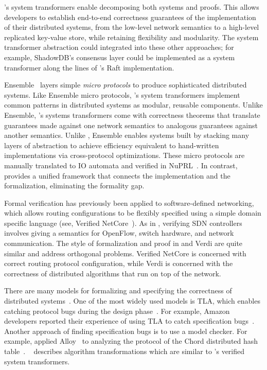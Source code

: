 \Verdi's system transformers enable decomposing both systems and proofs.
This allows developers to establish end-to-end correctness guarantees of
the implementation of their distributed systems, from the low-level network
semantics to a high-level replicated key-value store, while retaining
flexibility and modularity. The system transformer abstraction could
integrated into these other approaches; for example, ShadowDB's consensus
layer could be implemented as a system transformer along the lines of
\Verdi's Raft implementation.

Ensemble~\cite{hayden:ensemble} layers simple \textit{micro protocols}
to produce sophisticated distributed systems. Like Ensemble micro
protocols, \Verdi's system transformers implement common patterns in
distributed systems as modular, reusable components.  Unlike Ensemble,
\Verdi's systems transformers come with correctness theorems that
translate guarantees made against one network semantics to analogous
guarantees against another semantics.  Unlike \Verdi, Ensemble enables
systems built by stacking many layers of abstraction to achieve
efficiency equivalent to hand-written implementations via
cross-protocol optimizations. These micro protocols are manually
translated to IO automata and verified in
NuPRL~\cite{liu:ensemble-nuprl,ensemble-verification}. In contrast,
\Verdi provides a unified framework that connects the implementation
and the formalization, eliminating the formality gap.

 Formal verification has previously been applied to
software-defined networking, which allows routing configurations to be
flexibly specified using a simple domain specific language (see, \eg
Verified NetCore~\cite{guha:verified-openflow}).  As in \Verdi,
verifying SDN controllers involves giving a semantics for OpenFlow,
switch hardware, and network communication. The style of formalization
and proof in and Verdi are quite similar and address orthogonal
problems. Verified NetCore is concerned with correct routing protocol
configuration, while Verdi is concerned with the correctness of
distributed algorithms that run on top of the network.

There are many models for formalizing and specifying the correctness
of distributed systems~\cite{ioautomata,petrinets,pi-calculus}. One of the most
widely used models is TLA, which enables catching protocol bugs during
the design phase~\cite{lamport:thinking}.  For example, Amazon
developers reported their experience of using TLA to catch
specification bugs~\cite{newcombe:s3}.  Another approach of finding
specification bugs is to use a model checker.  For example,
\citeauthor{zave:chord-alloy} applied Alloy~\cite{jackson:alloy} to
analyzing the protocol of the Chord distributed hash
table~\cite{zave:chord-alloy}. \citeauthor{Lynch:1996:DA:525656}~
describes algorithm transformations which are similar to \Verdi's
verified system transformers.

